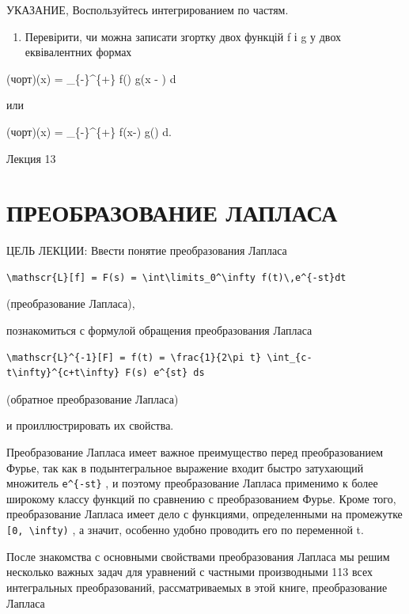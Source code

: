 \documentclass[
  ukrainian,
]{article}
\providecommand{\tightlist}{%
  \setlength{\itemsep}{0pt}\setlength{\parskip}{0pt}}
\begin{document}
УКАЗАНИЕ, Воспользуйтесь интегрированием по частям.

\begin{enumerate}
\def\labelenumi{\arabic{enumi}.}
\setcounter{enumi}{4}
\tightlist
\item
  Перевірити, чи можна записати згортку двох функцій f і g у двох
  еквівалентних формах
\end{enumerate}

(чорт)(x) =  \int\_\{-\infty\}\^{}\{+\infty\}
f(\xi) g(x - \xi) d\xi

или

(чорт)(x) =  \int\_\{-\infty\}\^{}\{+\infty\}
f(x-\xi) g(\xi) d\xi.

Лекция 13

\section{ПРЕОБРАЗОВАНИЕ
ЛАПЛАСА}\label{ux43fux440ux435ux43eux431ux440ux430ux437ux43eux432ux430ux43dux438ux435-ux43bux430ux43fux43bux430ux441ux430}

ЦЕЛЬ ЛЕКЦИИ: Ввести понятие преобразования Лапласа

\begin{verbatim}
\mathscr{L}[f] = F(s) = \int\limits_0^\infty f(t)\,e^{-st}dt
\end{verbatim}

(преобразование Лапласа),

познакомиться с формулой обращения преобразования Лапласа

\begin{verbatim}
\mathscr{L}^{-1}[F] = f(t) = \frac{1}{2\pi t} \int_{c-t\infty}^{c+t\infty} F(s) e^{st} ds
\end{verbatim}

(обратное преобразование Лапласа)

и проиллюстрировать их свойства.

Преобразование Лапласа имеет важное преимущество перед преобразованием
Фурье, так как в подынтегральное выражение входит быстро затухающий
множитель \texttt{e\^{}\{-st\}} , и поэтому преобразование Лапласа
применимо к более широкому классу функций по сравнению с преобразованием
Фурье. Кроме того, преобразование Лапласа имеет дело с функциями,
определенными на промежутке \texttt{{[}0,\ \textbackslash{}infty)} , а
значит, особенно удобно проводить его по переменной t.

После знакомства с основными свойствами преобразования Лапласа мы решим
несколько важных задач для уравнений с частными производными 113 всех
интегральных преобразований, рассматриваемых в этой книге,
преобразование Лапласа
\end{document}
